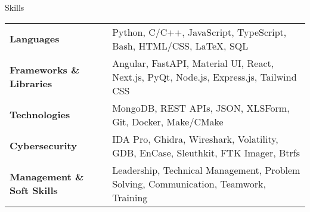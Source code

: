 \documentclass{resume} %
\date{\today}
\begin{document}
\begin{rSection}{Skills}

\begin{tabular}{ @{} >{\bfseries}l @{\hspace{8ex}} l }
Languages \ & Python, C/C++, JavaScript, TypeScript, Bash, HTML/CSS, \LaTeX, SQL \\
Frameworks \& Libraries \ & Angular, FastAPI, Material UI, React, Next.js, PyQt, Node.js, Express.js, Tailwind CSS \\
Technologies \ & MongoDB, REST APIs, JSON, XLSForm, Git, Docker, Make/CMake \\
Cybersecurity \ & IDA Pro, Ghidra, Wireshark, Volatility, GDB, EnCase, Sleuthkit, FTK Imager, Btrfs \\
Management \& Soft Skills \ & Leadership, Technical Management, Problem Solving, Communication, Teamwork, Training \\
\end{tabular}
\end{rSection}
\end{document}
